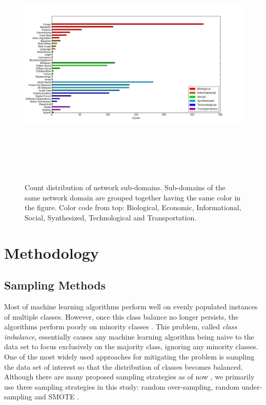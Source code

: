 \documentclass{article}
\begin{document}
	\begin{figure}[ht]
	\begin{center}
		\vspace{0.5cm}
		\includegraphics[clip,width=19cm,height = 12cm]{figs/subdomain_dist.png}
		\vspace{0.5cm}
		\caption{Count distribution of network sub-domains. Sub-domains of the same network domain are grouped together having the same color in the figure. Color code from top: Biological, Economic, Informational, Social, Synthesized, Technological and Transportation.}
		\label{sub_dist}
	\end{center}
	\end{figure}

	

\section{Methodology}

	\subsection{Sampling Methods}
Most of machine learning algorithms perform well on evenly populated instances of multiple classes. However, once this class balance no longer persists, the algorithms perform poorly on minority classes . This problem, called \textit{class imbalance}, essentially causes any machine learning algorithm being naive to the data set to focus exclusively on the majority class, ignoring any minority classes. One of the most widely used approaches for mitigating the problem is sampling the data set of interest so that the distribution of classes becomes balanced. Although there are many proposed sampling strategies as of now \cite{SurveySampling}, we primarily use three sampling strategies in this study: random over-sampling, random under-sampling and SMOTE \cite{SMOTE}.
\end{document}
